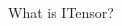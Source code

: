 \begin{frame}{What is ITensor?}
\begin{columns}
\begin{column}[T]{0.3\textwidth}
\begin{columns}
\begin{column}[T]{0.5\textwidth}
      \end{column}

    \end{columns}

  \end{column}

\end{columns}

\end{frame}
